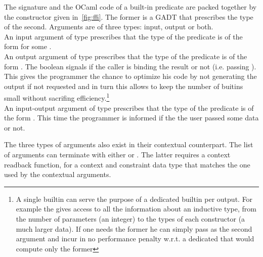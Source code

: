 \documentclass[a4paper, 11pt]{book}
\begin{document}
The signature and the OCaml code of a built-in predicate are packed
together by the  constructor given in~\cref{fig:ffi}.
The former is a GADT that prescribes the type of the second.
Arguments are of three types: input, output or both.\\
An input argument of type  prescribes that the type of the predicate
 is of the form  for some .\\
An output argument of type 
prescribes that the type of the predicate  is of the form
. The boolean signals if the
caller is binding the result or not (i.e. passing \elpi{_}). This gives
the programmer the chance to optimize his code by not generating the output
if not requested and in turn this allows to keep the number of buitins small
without sacrifing efficiency.\footnote{A single builtin can serve the purpose of
a dedicated builtin per output. For example the  gives
access to all the information about an inductive type, from the number of
parameters (an integer) to the types of each constructor (a much larger data).
If one needs the former he can simply pass \elpi{_} as the second argument
and incur in no performance penalty w.r.t. a dedicated
 that would compute only the former}\\
An input-output argument of type 
prescribes that the type of the predicate  is of the form
. This time the programmer is informed if the
the user passed some data or not.

The three types of arguments also exist in their contextual counterpart.
The list of arguments can terminate with either  or
. The latter requires a context readback function, for a context
and constraint data type that matches the one used by the contextual arguments.
\end{document}
